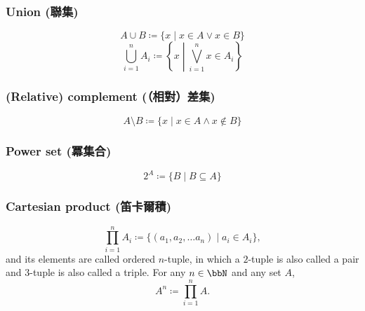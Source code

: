 \documentclass[a4paper,12pt]{report}
\begin{document}
\subsubsection{Union (聯集)}
\[A\cup B\coloneq\{x\mid x\in A \lor x\in B\}\]
\[\bigcup_{i=1}^n A_i\coloneq\left\{x\middle | \bigvee_{i=1}^n x\in A_i\right\}\]
\subsubsection{(Relative) complement (（相對）差集)}
\[A\setminus B\coloneq\{x\mid x\in A \land x\notin B\}\]
\subsubsection{Power set (冪集合)}
\[2^A\coloneq\{B\mid B\subseteq A\}\]
\subsubsection{Cartesian product (笛卡爾積)}
\[\prod_{i=1}^nA_i\coloneq\{(a_1,a_2,\ldots a_n)\mid a_i\in A_i\},\]
and its elements are called ordered $n$-tuple, in which a $2$-tuple is also called a pair and $3$-tuple is also called a triple.
For any $n\in\bbN$ and any set $A$,
\[A^n\coloneq\prod_{i=1}^nA.\]
\end{document}
